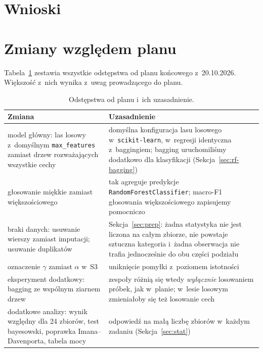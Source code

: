 \documentclass[11pt,a4paper]{article}
\begin{document}






\section{Wnioski}



\section{Zmiany względem planu}

Tabela~\ref{tab:zmiany} zestawia wszystkie odstępstwa od planu końcowego z~20.10.2026. Większość z~nich wynika z~uwag prowadzącego do planu.

\begin{table}[!htbp]
\centering\small
\caption{Odstępstwa od planu i~ich uzasadnienie.}
\label{tab:zmiany}
\begin{tabularx}{\textwidth}{>{\raggedright\arraybackslash}p{}X}
\toprule
\textbf{Zmiana} & \textbf{Uzasadnienie} \\
\midrule
model główny: las losowy z~domyślnym \texttt{max\_features} zamiast drzew rozważających wszystkie cechy & domyślna konfiguracja lasu losowego w~\texttt{scikit-learn}, w~regresji identyczna z~baggingiem; bagging uruchomiliśmy dodatkowo dla klasyfikacji (Sekcja~\ref{sec:rf-bagging}) \\
głosowanie miękkie zamiast większościowego & tak agreguje predykcje \texttt{RandomForestClassifier}; macro-F1 głosowania większościowego zapisujemy pomocniczo \\
braki danych: usuwanie wierszy zamiast imputacji; usuwanie duplikatów & Sekcja~\ref{sec:prep}: żadna statystyka nie jest liczona na całym zbiorze, nie powstaje sztuczna kategoria i~żadna obserwacja nie trafia jednocześnie do obu części podziału \\
oznaczenie $\gamma$ zamiast $\alpha$ w~S3 & uniknięcie pomyłki z~poziomem istotności \\
eksperyment dodatkowy: bagging ze wspólnym ziarnem drzew & zespoły różnią się wtedy \emph{wyłącznie} losowaniem próbek, jak w~planie; w~lesie losowym zmieniałoby się też losowanie cech \\
dodatkowe analizy: wynik względny dla 24 zbiorów, test bayesowski, poprawka Imana--Davenporta, tabela mocy & odpowiedź na małą liczbę zbiorów w~każdym zadaniu (Sekcja~\ref{sec:stat}) \\
\bottomrule
\end{tabularx}
\end{table}
\end{document}
